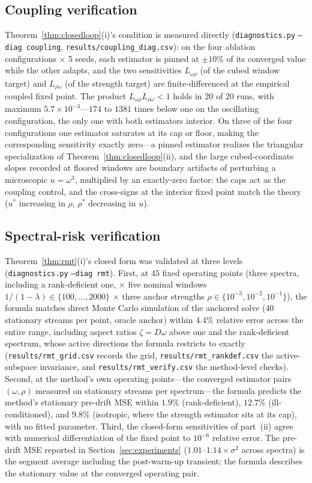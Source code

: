 \subsection{Coupling verification}
Theorem~\ref{thm:closedloop}(i)'s condition is measured directly (\texttt{diagnostics.py} \texttt{--diag coupling}, \texttt{results/coupling\_diag.csv}): on the four ablation configurations $\times$ 5 seeds, each estimator is pinned at $\pm 10\%$ of its converged value while the other adapts, and the two sensitivities $L_{\omega\rho}$ (of the cubed window target) and $L_{\rho\omega}$ (of the strength target) are finite-differenced at the empirical coupled fixed point.
The product $L_{\omega\rho} L_{\rho\omega} < 1$ holds in 20 of 20 runs, with maximum $5.7 \times 10^{-3}$---$174$ to $1381$ times below one on the oscillating configuration, the only one with both estimators interior.
On three of the four configurations one estimator saturates at its cap or floor, making the corresponding sensitivity exactly zero---a pinned estimator realizes the triangular specialization of Theorem~\ref{thm:closedloop}(ii), and the large cubed-coordinate slopes recorded at floored windows are boundary artifacts of perturbing a microscopic $u = \omega^3$, multiplied by an exactly-zero factor: the caps act as the coupling control, and the cross-signs at the interior fixed point match the theory ($u^*$ increasing in $\rho$, $\rho^*$ decreasing in $u$).

\subsection{Spectral-risk verification}
Theorem~\ref{thm:rmt}(i)'s closed form was validated at three levels (\texttt{diagnostics.py} \texttt{--diag rmt}).
First, at $45$ fixed operating points (three spectra, including a rank-deficient one, $\times$ five nominal windows $1/(1-\lambda) \in \{100, \dots, 2000\}$ $\times$ three anchor strengths $\rho \in \{10^{-3}, 10^{-2}, 10^{-1}\}$), the formula matches direct Monte Carlo simulation of the anchored solve ($40$ stationary streams per point, oracle anchor) within $4.4\%$ relative error across the entire range, including aspect ratios $\zeta = D\omega$ above one and the rank-deficient spectrum, whose active directions the formula restricts to exactly (\texttt{results/rmt\_grid.csv} records the grid, \texttt{results/rmt\_rankdef.csv} the active-subspace invariance, and \texttt{results/rmt\_verify.csv} the method-level checks).
Second, at the method's own operating points---the converged estimator pairs $(\omega, \rho)$ measured on stationary streams per spectrum---the formula predicts the method's stationary pre-drift MSE within $1.9\%$ (rank-deficient), $12.7\%$ (ill-conditioned), and $9.8\%$ (isotropic, where the strength estimator sits at its cap), with no fitted parameter.
Third, the closed-form sensitivities of part~(ii) agree with numerical differentiation of the fixed point to $10^{-6}$ relative error.
The pre-drift MSE reported in Section~\ref{sec:experiments} ($1.01$--$1.14 \times \sigma^2$ across spectra) is the segment average including the post-warm-up transient; the formula describes the stationary value at the converged operating pair.

